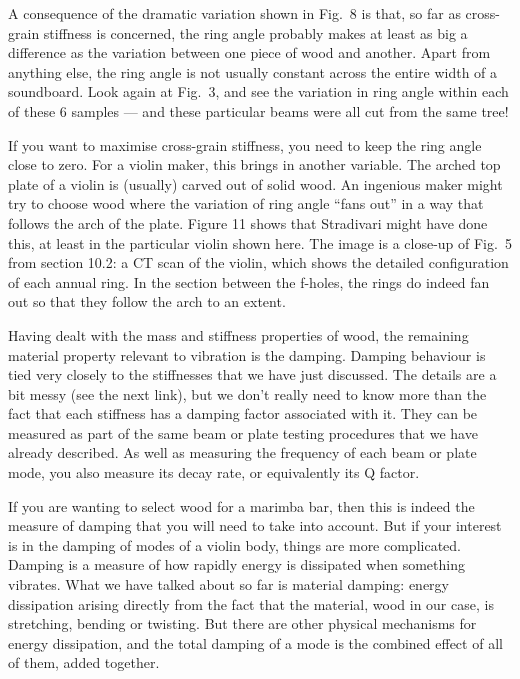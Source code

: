   A consequence of the dramatic variation shown in Fig.\ 8 is that, so far as 
  cross-grain stiffness is concerned, the ring angle probably makes at least as 
  big a difference as the variation between one piece of wood and another. 
  Apart from anything else, the ring angle is not usually constant across the 
  entire width of a soundboard. Look again at Fig.\ 3, and see the variation in 
  ring angle within each of these 6 samples — and these particular beams were 
  all cut from the same tree! 

  If you want to maximise cross-grain stiffness, you need to keep the ring 
  angle close to zero. For a violin maker, this brings in another variable. The 
  arched top plate of a violin is (usually) carved out of solid wood. An 
  ingenious maker might try to choose wood where the variation of ring angle 
  “fans out” in a way that follows the arch of the plate. Figure 11 shows that 
  Stradivari might have done this, at least in the particular violin shown 
  here. The image is a close-up of Fig.\ 5 from section 10.2: a CT scan of the 
  violin, which shows the detailed configuration of each annual ring. In the 
  section between the f-holes, the rings do indeed fan out so that they follow 
  the arch to an extent. 

  Having dealt with the mass and stiffness properties of wood, the remaining 
  material property relevant to vibration is the damping. Damping behaviour is 
  tied very closely to the stiffnesses that we have just discussed. The details 
  are a bit messy (see the next link), but we don’t really need to know more 
  than the fact that each stiffness has a damping factor associated with it. 
  They can be measured as part of the same beam or plate testing procedures 
  that we have already described. As well as measuring the frequency of each 
  beam or plate mode, you also measure its decay rate, or equivalently its Q 
  factor. 

  If you are wanting to select wood for a marimba bar, then this is indeed the 
  measure of damping that you will need to take into account. But if your 
  interest is in the damping of modes of a violin body, things are more 
  complicated. Damping is a measure of how rapidly energy is dissipated when 
  something vibrates. What we have talked about so far is material damping: 
  energy dissipation arising directly from the fact that the material, wood in 
  our case, is stretching, bending or twisting. But there are other physical 
  mechanisms for energy dissipation, and the total damping of a mode is the 
  combined effect of all of them, added together. 

